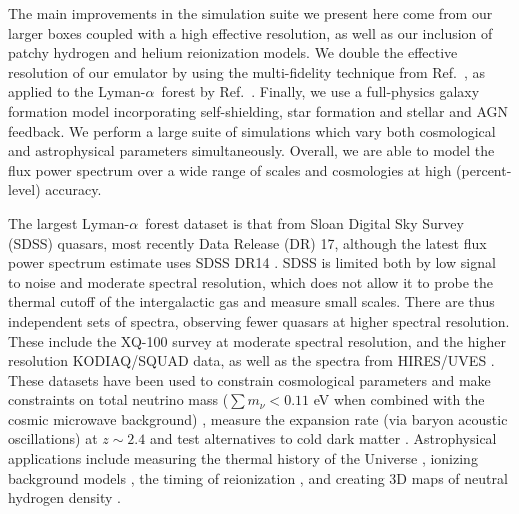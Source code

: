 \documentclass[a4paper,11pt]{article}
\newcommand{\Lya}{Lyman-$\alpha$}
\begin{document}
The main improvements in the simulation suite we present here come from our larger boxes coupled with a high effective resolution, as well as our inclusion of patchy hydrogen and helium reionization models. We double the effective resolution of our emulator by using the multi-fidelity technique from Ref.~\cite{Ho:2022}, as applied to the \Lya~forest by Ref.~\cite{Fernandez:2022}. Finally, we use a full-physics galaxy formation model incorporating self-shielding, star formation and stellar and AGN feedback. We perform a large suite of simulations which vary both cosmological and astrophysical parameters simultaneously. Overall, we are able to model the flux power spectrum over a wide range of scales and cosmologies at high (percent-level) accuracy.


The largest \Lya~forest dataset is that from Sloan Digital Sky Survey (SDSS) quasars, most recently Data Release (DR) 17, although the latest flux power spectrum estimate uses SDSS DR14 \cite{Chabanier:2019}. SDSS is limited both by low signal to noise and moderate spectral resolution, which does not allow it to probe the thermal cutoff of the intergalactic gas and measure small scales. There are thus independent sets of spectra, observing fewer quasars at higher spectral resolution. These include the XQ-100 survey \cite{Irsic:2017pk, Esposito:2022} at moderate spectral resolution, and the higher resolution KODIAQ/SQUAD \cite{KODIAQ:2022} data, as well as the spectra from HIRES/UVES \cite{Viel:2013wdm, Boera:2019}. These datasets have been used to constrain cosmological parameters and make constraints on total neutrino mass ($\sum m_\nu < 0.11$ eV when combined with the cosmic microwave background) \citep{2004MNRAS.354..684V, McDonald:2005pk, Viel:2006, 2005PhRvD..71j3515S, 2006JCAP...10..014S, Rossi:2017, 2020JCAP...04..038P}, measure the expansion rate (via baryon acoustic oscillations) at $z \sim 2.4$ \cite{Slosar:2011, Bautista:2017, dSAgathe:2019} and test alternatives to cold dark matter \citep{2005PhRvD..71f3534V,  Viel:2013wdm, Irsic:2017pk, Garzilli:2021, 2021PhRvL.126g1302R}. Astrophysical applications include measuring the thermal history of the Universe \citep{2008MNRAS.386.1131B,2014MNRAS.438.2499B, 2016MNRAS.463.2335N, Boera:2019, Gaikwad:2021, Villasenor:2022, Yang:2023}, ionizing background models \cite{Puchwein:2019, FG:2020}, the timing of reionization \citep{Gaikwad:2017,Onorbe:2017,Chardin:2017,DAloisio:2017}, and creating 3D maps of neutral hydrogen density \citep{Lee:2016, Ozbek:2016, Lee:2018, Horowitz:2022, Qezlou:2022}.
\end{document}
